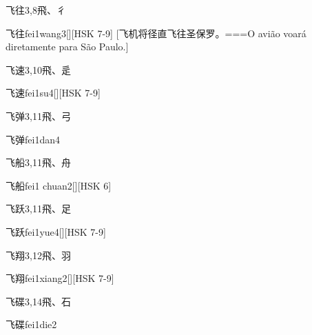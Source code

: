 \begin{Entry}{飞往}{3,8}{⾶、⼻}
  \begin{Phonetics}{飞往}{fei1wang3}[][HSK 7-9]
    [飞机将径直飞往圣保罗。===O avião voará diretamente para São Paulo.]
  \end{Phonetics}
\end{Entry}

\begin{Entry}{飞速}{3,10}{⾶、⾡}
  \begin{Phonetics}{飞速}{fei1su4}[][HSK 7-9]
  \end{Phonetics}
\end{Entry}

\begin{Entry}{飞弹}{3,11}{⾶、⼸}
  \begin{Phonetics}{飞弹}{fei1dan4}
  \end{Phonetics}
\end{Entry}

\begin{Entry}{飞船}{3,11}{⾶、⾈}
  \begin{Phonetics}{飞船}{fei1 chuan2}[][HSK 6]
  \end{Phonetics}
\end{Entry}

\begin{Entry}{飞跃}{3,11}{⾶、⾜}
  \begin{Phonetics}{飞跃}{fei1yue4}[][HSK 7-9]
  \end{Phonetics}
\end{Entry}

\begin{Entry}{飞翔}{3,12}{⾶、⽻}
  \begin{Phonetics}{飞翔}{fei1xiang2}[][HSK 7-9]
  \end{Phonetics}
\end{Entry}

\begin{Entry}{飞碟}{3,14}{⾶、⽯}
  \begin{Phonetics}{飞碟}{fei1die2}
  \end{Phonetics}
\end{Entry}



